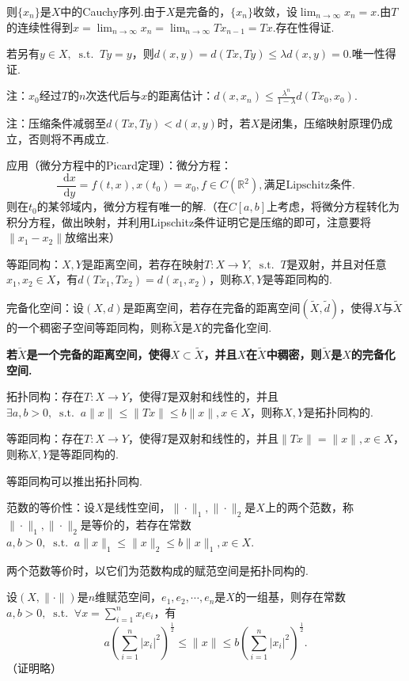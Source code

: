 \documentclass[bwprint, withoutpreface]{cumcmthesis}
\newcommand*{\st}{\mathop{}\!\mathrm{s.t.}\!\mathop{}}
\newcommand*{\dif}{\mathop{}\!\mathrm{d}}
\newcommand*{\norm}[1]{\| #1 \|}
\newcommand*{\nnorm}[2]{\| #1 \|_{#2}}
\begin{document}
则$\{x_n\}$是$X$中的Cauchy序列.由于$X$是完备的，$\{x_n\}$收敛，设$\lim_{n \to \infty}{x_n} = x$.由$T$的连续性得到$x = \lim_{n \to \infty}{x_n} = \lim_{n \to \infty}{Tx_{n - 1}} = Tx$.存在性得证.

若另有$y \in X, \st Ty = y$，则$d(x, y) = d(Tx, Ty) \leqslant \lambda d(x, y) = 0.$唯一性得证.

注：$x_0$经过$T$的$n$次迭代后与$x$的距离估计：$d(x, x_n) \leqslant \frac{\lambda^n}{1 - \lambda} d(Tx_0, x_0)$.

注：压缩条件减弱至$d(Tx, Ty) < d(x, y)$时，若$X$是闭集，压缩映射原理仍成立，否则将不再成立.

应用（微分方程中的Picard定理）：微分方程：
\begin{equation*}
	\frac{\dif x}{\dif y} = f(t, x), x(t_0) = x_0, f \in C(\mathbb{R}^2), \mbox{满足Lipschitz条件}.
\end{equation*}
则在$t_0$的某邻域内，微分方程有唯一的解.（在$C[a, b]$上考虑，将微分方程转化为积分方程，做出映射，并利用Lipschitz条件证明它是压缩的即可，注意要将$\norm{x_1 - x_2}$放缩出来）

等距同构：$X, Y$是距离空间，若存在映射$T:X \to Y, \st T$是双射，并且对任意$x_1, x_2 \in X$，有$d(Tx_1, Tx_2) = d(x_1, x_2)$，则称$X, Y$是等距同构的.

完备化空间：设$(X, d)$是距离空间，若存在完备的距离空间$(\tilde{X}, \tilde{d})$，使得$X$与$\tilde{X}$的一个稠密子空间等距同构，则称$\tilde{X}$是$X$的完备化空间.

\textbf{若$\tilde{X}$是一个完备的距离空间，使得$X \subset \tilde{X}$，并且$X$在$\tilde{X}$中稠密，则$\tilde{X}$是$X$的完备化空间.}

拓扑同构：存在$T:X \to Y$，使得$T$是双射和线性的，并且$\exists a, b > 0, \st a \norm{x} \leqslant \norm{Tx} \leqslant b \norm{x},x \in X$，则称$X, Y$是拓扑同构的.

等距同构：存在$T:X \to Y$，使得$T$是双射和线性的，并且$\norm{Tx} = \norm{x}, x \in X$，则称$X, Y$是等距同构的.

等距同构可以推出拓扑同构.

范数的等价性：设$X$是线性空间，$\nnorm{\cdot}{1}, \nnorm{\cdot}{2}$是$X$上的两个范数，称$\nnorm{\cdot}{1}, \nnorm{\cdot}{2}$是等价的，若存在常数$a, b > 0, \st a \nnorm{x}{1} \leqslant \nnorm{x}{2} \leqslant b \nnorm{x}{1}, x \in X$.

两个范数等价时，以它们为范数构成的赋范空间是拓扑同构的.

设$(X, \norm{\cdot})$是$n$维赋范空间，$e_1, e_2, \cdots, e_n$是$X$的一组基，则存在常数$a, b > 0, \st \forall x = \sum_{i = 1}^{n}{x_i e_i}$，有
\begin{equation*}
	a(\sum_{i = 1}^{n}{|x_i|^2})^\frac{1}{2} \leqslant \norm{x} \leqslant b (\sum_{i = 1}^{n}{|x_i|^2})^\frac{1}{2}.
\end{equation*}
（证明略）
\end{document}
